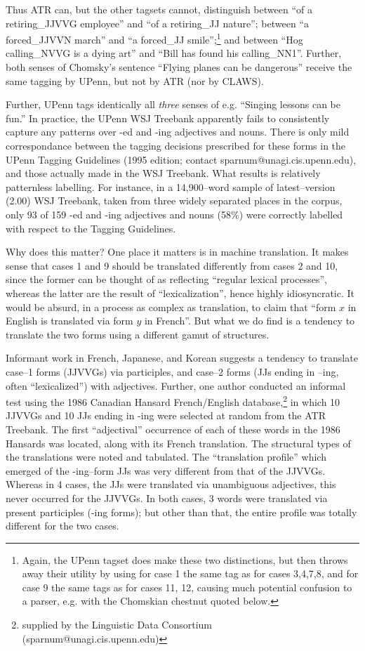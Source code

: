 Thus ATR can, but the other tagsets cannot, distinguish between ``of a
retiring\_JJVVG employee'' and ``of a retiring\_JJ nature''; between
``a forced\_JJVVN march'' and ``a forced\_JJ smile'';\footnote{Again,
the UPenn tagset does make these two distinctions, but then throws
away their utility by using for case 1 the same tag as for cases
3,4,7,8, and for case 9 the same tags as for cases 11, 12, causing
much potential confusion to a parser, e.g. with the Chomskian chestnut
quoted below.} and between ``Hog calling\_NVVG is a dying art'' and
``Bill has found his calling\_NN1''. Further, both senses of Chomsky's
sentence ``Flying planes can be dangerous'' receive the same tagging
by UPenn, but not by ATR (nor by CLAWS).


Further, UPenn tags identically all {\em three} senses of
e.g. ``Singing lessons can be fun.'' In practice, the UPenn WSJ
Treebank apparently fails to consistently capture any patterns over 
-ed and -ing adjectives and nouns. There is only mild correspondance
between the tagging decisions prescribed for these forms in the UPenn
Tagging Guidelines (1995 edition; contact
sparnum@unagi.cis.upenn.edu), and
those actually made in the WSJ
Treebank. What \mbox{results} is relatively
patternless labelling.  For
instance, in a 14,900--word sample of latest--version (2.00) WSJ
Treebank, taken from three widely separated places in the corpus, only
93 of 159 -ed and -ing adjectives and nouns (58\%) were correctly
labelled with respect to the Tagging Guidelines.

Why does this matter? One place it matters is in machine translation. 
It makes sense that cases 1 and 9 should be translated differently
from cases 2 and 10, since the former can be thought of as reflecting
``regular lexical processes'', whereas the latter are the result of
``lexicalization'', hence highly idiosyncratic. It would be absurd, in
a process as complex as translation, to claim that ``form $x$ in English
is translated via form $y$ in French''. But what we do find is a
tendency to translate the two forms using a different gamut of
structures.

Informant work in French, Japanese, and Korean suggests a tendency to
translate case--1 forms (JJVVGs) via participles, and case--2 forms
(JJs ending in --ing, often ``lexicalized'') with adjectives. Further,
one author conducted an informal test using the 1986 Canadian Hansard
French/English database,\footnote{supplied by the Linguistic Data
Consortium (sparnum@unagi.cis.upenn.edu)} in which 10 JJVVGs
and 10 JJs ending in -ing were selected at random from the ATR
Treebank. The first ``adjectival'' occurrence of each of these words
in the 1986 Hansards was located, along with its French translation.
The structural types of the translations were noted and tabulated.
The ``translation profile'' which emerged of the -ing--form JJs was
very different from that of the JJVVGs. Whereas in 4 cases, the JJs
were translated via unambiguous adjectives, this never occurred for
the JJVVGs. In both cases, 3 words were translated via present
participles (-ing forms); but other than that, the entire profile was
totally different for the two cases.



